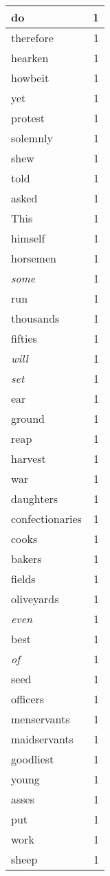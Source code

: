 \begin{center}
\begin{longtable}{l|r}
do & 1 \\ \hline
therefore & 1 \\ \hline
hearken & 1 \\ \hline
howbeit & 1 \\ \hline
yet & 1 \\ \hline
protest & 1 \\ \hline
solemnly & 1 \\ \hline
shew & 1 \\ \hline
told & 1 \\ \hline
asked & 1 \\ \hline
This & 1 \\ \hline
himself & 1 \\ \hline
horsemen & 1 \\ \hline
\emph{some} & 1 \\ \hline
run & 1 \\ \hline
thousands & 1 \\ \hline
fifties & 1 \\ \hline
\emph{will} & 1 \\ \hline
\emph{set} & 1 \\ \hline
ear & 1 \\ \hline
ground & 1 \\ \hline
reap & 1 \\ \hline
harvest & 1 \\ \hline
war & 1 \\ \hline
daughters & 1 \\ \hline
confectionaries & 1 \\ \hline
cooks & 1 \\ \hline
bakers & 1 \\ \hline
fields & 1 \\ \hline
oliveyards & 1 \\ \hline
\emph{even} & 1 \\ \hline
best & 1 \\ \hline
\emph{of} & 1 \\ \hline
seed & 1 \\ \hline
officers & 1 \\ \hline
menservants & 1 \\ \hline
maidservants & 1 \\ \hline
goodliest & 1 \\ \hline
young & 1 \\ \hline
asses & 1 \\ \hline
put & 1 \\ \hline
work & 1 \\ \hline
sheep & 1 \\ \hline

\end{longtable}
\end{center}
